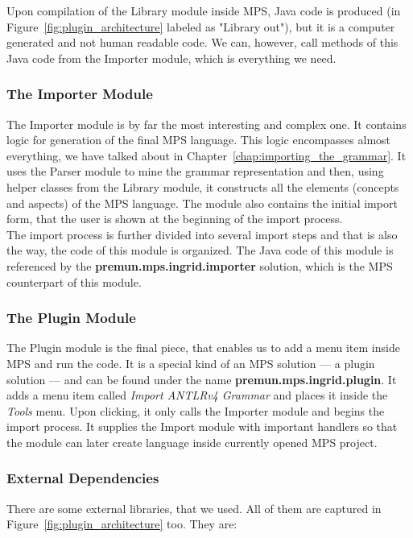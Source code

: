 Upon compilation of the Library module inside MPS, Java code is produced (in Figure~\ref{fig:plugin_architecture} labeled as "Library out"), but it is a computer generated and not human readable code.
We can, however, call methods of this Java code from the Importer module, which is everything we need.

\subsubsection{The Importer Module}

The Importer module is by far the most interesting and complex one.
It contains logic for generation of the final MPS language.
This logic encompasses almost everything, we have talked about in Chapter~\ref{chap:importing_the_grammar}.
It uses the Parser module to mine the grammar representation and then, using helper classes from the Library module, it constructs all the elements (concepts and aspects) of the MPS language.
The module also contains the initial import form, that the user is shown at the beginning of the import process.
\\

The import process is further divided into several import steps and that is also the way, the code of this module is organized.
The Java code of this module is referenced by the \textbf{premun.mps.ingrid.importer} solution, which is the MPS counterpart of this module.

\subsubsection{The Plugin Module}

The Plugin module is the final piece, that enables us to add a menu item inside MPS and run the code.
It is a special kind of an MPS solution --- a plugin solution --- and can be found under the name \textbf{premun.mps.ingrid.plugin}.
It adds a menu item called \textit{Import ANTLRv4 Grammar} and places it inside the \textit{Tools} menu.
Upon clicking, it only calls the Importer module and begins the import process.
It supplies the Import module with important handlers so that the module can later create language inside currently opened MPS project.

\subsubsection{External Dependencies}

There are some external libraries, that we used.
All of them are captured in Figure~\ref{fig:plugin_architecture} too.
They are:

